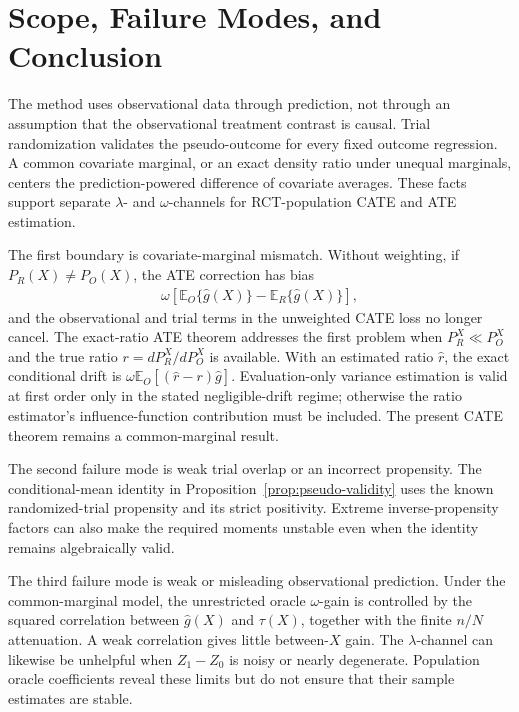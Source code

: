 \section{Scope, Failure Modes, and Conclusion}
\label{sec:conclusion}

The method uses observational data through prediction, not through an assumption that the observational treatment contrast is causal. Trial randomization validates the pseudo-outcome for every fixed outcome regression. A common covariate marginal, or an exact density ratio under unequal marginals, centers the prediction-powered difference of covariate averages. These facts support separate $\lambda$- and $\omega$-channels for RCT-population CATE and ATE estimation.

The first boundary is covariate-marginal mismatch. Without weighting, if $P_R(X)\neq P_O(X)$, the ATE correction has bias
\begin{align}
\omega
\left[
\mathbb E_O\{\widehat{g}(X)\}
-
\mathbb E_R\{\widehat{g}(X)\}
\right],
\end{align}
and the observational and trial terms in the unweighted CATE loss no longer cancel. The exact-ratio ATE theorem addresses the first problem when $P_R^X\ll P_O^X$ and the true ratio $r=dP_R^X/dP_O^X$ is available. With an estimated ratio $\widehat r$, the exact conditional drift is $\omega\mathbb E_O[(\widehat r-r)\widehat{g}]$. Evaluation-only variance estimation is valid at first order only in the stated negligible-drift regime; otherwise the ratio estimator's influence-function contribution must be included. The present CATE theorem remains a common-marginal result.

The second failure mode is weak trial overlap or an incorrect propensity. The conditional-mean identity in Proposition~\ref{prop:pseudo-validity} uses the known randomized-trial propensity and its strict positivity. Extreme inverse-propensity factors can also make the required moments unstable even when the identity remains algebraically valid.

The third failure mode is weak or misleading observational prediction. Under the common-marginal model, the unrestricted oracle $\omega$-gain is controlled by the squared correlation between $\widehat{g}(X)$ and $\tau(X)$, together with the finite $n/N$ attenuation. A weak correlation gives little between-$X$ gain. The $\lambda$-channel can likewise be unhelpful when $Z_1-Z_0$ is noisy or nearly degenerate. Population oracle coefficients reveal these limits but do not ensure that their sample estimates are stable.

